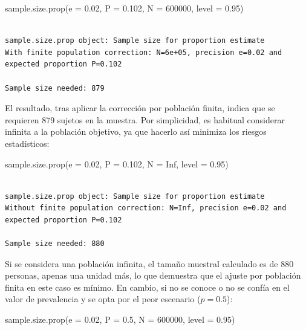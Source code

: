 \documentclass[
  spanish,
  a4paper,
]{scrbook}
\newenvironment{Shaded}{\begin{snugshade}}{\end{snugshade}}
\newcommand{\AttributeTok}[1]{\textcolor[rgb]{0.40,0.45,0.13}{#1}}
\newcommand{\ConstantTok}[1]{\textcolor[rgb]{0.56,0.35,0.01}{#1}}
\newcommand{\DecValTok}[1]{\textcolor[rgb]{0.68,0.00,0.00}{#1}}
\newcommand{\FloatTok}[1]{\textcolor[rgb]{0.68,0.00,0.00}{#1}}
\newcommand{\FunctionTok}[1]{\textcolor[rgb]{0.28,0.35,0.67}{#1}}
\newcommand{\NormalTok}[1]{\textcolor[rgb]{0.00,0.23,0.31}{#1}}
\begin{document}
\begin{Shaded}
\begin{Highlighting}[]
\FunctionTok{sample.size.prop}\NormalTok{(}\AttributeTok{e =} \FloatTok{0.02}\NormalTok{, }\AttributeTok{P =} \FloatTok{0.102}\NormalTok{, }\AttributeTok{N =} \DecValTok{600000}\NormalTok{, }\AttributeTok{level =} \FloatTok{0.95}\NormalTok{)}
\end{Highlighting}
\end{Shaded}

\begin{verbatim}

sample.size.prop object: Sample size for proportion estimate
With finite population correction: N=6e+05, precision e=0.02 and expected proportion P=0.102

Sample size needed: 879
\end{verbatim}

El resultado, tras aplicar la corrección por población finita, indica
que se requieren 879 sujetos en la muestra. Por simplicidad, es habitual
considerar infinita a la población objetivo, ya que hacerlo así minimiza
los riesgos estadísticos:

\begin{Shaded}
\begin{Highlighting}[]
\FunctionTok{sample.size.prop}\NormalTok{(}\AttributeTok{e =} \FloatTok{0.02}\NormalTok{, }\AttributeTok{P =} \FloatTok{0.102}\NormalTok{, }\AttributeTok{N =} \ConstantTok{Inf}\NormalTok{, }\AttributeTok{level =} \FloatTok{0.95}\NormalTok{)}
\end{Highlighting}
\end{Shaded}

\begin{verbatim}

sample.size.prop object: Sample size for proportion estimate
Without finite population correction: N=Inf, precision e=0.02 and expected proportion P=0.102

Sample size needed: 880
\end{verbatim}

Si se considera una población infinita, el tamaño muestral calculado es
de 880 personas, apenas una unidad más, lo que demuestra que el ajuste
por población finita en este caso es mínimo. En cambio, si no se conoce
o no se confía en el valor de prevalencia y se opta por el peor
escenario (\(p = 0.5\)):

\begin{Shaded}
\begin{Highlighting}[]
\FunctionTok{sample.size.prop}\NormalTok{(}\AttributeTok{e =} \FloatTok{0.02}\NormalTok{, }\AttributeTok{P =} \FloatTok{0.5}\NormalTok{, }\AttributeTok{N =} \DecValTok{600000}\NormalTok{, }\AttributeTok{level =} \FloatTok{0.95}\NormalTok{)}
\end{Highlighting}
\end{Shaded}
\end{document}
